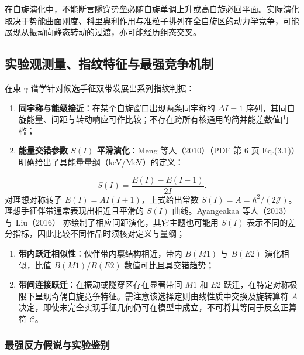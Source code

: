 在自旋演化中，不能断言隧穿势垒必随自旋单调上升或高自旋必回平面。实际演化取决于势能曲面刚度、科里奥利作用与准粒子排列在全自旋区的动力学竞争，可能展现从振动向静态转动的过渡，亦可能经历组态交叉。

\subsection{实验观测量、指纹特征与最强竞争机制}\label{sec:3-5-6}

在束 $\gamma$ 谱学针对候选手征双带发展出系列指纹判据\cite{starosta-2001-n75-chiral-vibrations,meng-2010-open-problems-nuclear-chirality}：
\begin{enumerate}
\item \textbf{同宇称与能级接近}：在某个自旋窗口出现两条同宇称的 $\Delta I=1$ 序列，其同自旋能量、间距与转动响应可作比较；不存在跨所有核通用的简并能差数值门槛；
\item \textbf{能量交错参数 $S(I)$ 平滑演化}：Meng 等人（2010）\cite{meng-2010-open-problems-nuclear-chirality}（PDF 第 6 页 Eq.(3.1)）明确给出了具能量量纲（keV/MeV）的定义：
\end{enumerate}
\begin{equation}\label{eq:3-5-SI-definition}
S(I) = \frac{E(I) - E(I-1)}{2I}.
\end{equation}
对理想对称转子 $E(I) = A I(I+1)$，上式给出常数 $S(I) = A = \hbar^2 / (2\mathcal{J})$。理想手征伴带通常表现出相近且平滑的 $S(I)$ 曲线。Ayangeakaa 等人（2013）\cite{ayangeakaa-2013-evidence-multiple-chiral-doublet-bands-133ce} 与 Liu（2016）\cite{liu-chen-2016-78br-chirality-reflection-symmetry-thesis} 亦绘制了相应间距演化，其它主题也可能用 $S(I)$ 表示不同的差分指标，因此比较不同作品时须核对定义与量纲；
\begin{enumerate}
\item \textbf{带内跃迁相似性}：伙伴带内禀结构相近，带内 $B(M1)$ 与 $B(E2)$ 演化相似，比值 $B(M1)/B(E2)$ 数值可比且具交错趋势；
\item \textbf{带间连接跃迁}：在振动或隧穿区存在显著带间 $M1$ 和 $E2$ 跃迁，在特定对称极限下呈现奇偶自旋竞争特征\cite{koike-2004-chiral-bands-selection-rules}。需注意该选择定则由线性质中交换及旋转算符 $A$ 决定，即使未完全实现手征几何仍可在模型中成立，不可将其等同于反幺正算符 $\mathcal{C}$。
\end{enumerate}

\subsubsection{最强反方假说与实验鉴别}\label{sec:3-5-6-1}

